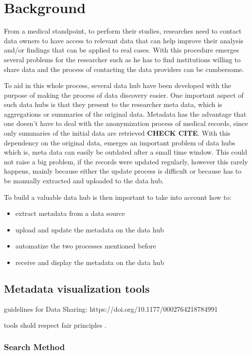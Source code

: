 \chapter{Background}
\label{chapter:background}

From a medical standpoint, to perform their studies, researches need to contact data
owners to have access to relevant data that can help improve their analysis and/or
findings that can be applied to real cases.
With this procedure emerges several problems for the researcher such as he has to find
institutions willing to share data and the process of contacting the data providers can
be cumbersome.

To aid in this whole process, several data hub have been developed with the purpose of
making the process of data discovery easier.
One important aspect of such data hubs is that they present to the researcher meta
data, which is aggregations or summaries of the original data.
Metadata has the advantage that one doesn't have to deal with the anonymization process
of medical records, since only summaries of the initial data are retrieved
\textbf{CHECK CITE}.
With this dependency on the original data, emerges an important problem of data hubs
which is, meta data can easily be outdated after a small time window.
This could not raise a big problem, if the records were updated regularly, however this
rarely happens, mainly because either the update process is difficult or because has to
be manually extracted and uploaded to the data hub.

To build a valuable data hub is then important to take into account how to:
\begin{itemize}
    \item extract metadata from a data source
    \item upload and update the metadata on the data hub
    \item automatize the two processes mentioned before
    \item receive and display the metadata on the data hub
\end{itemize}

\section{Metadata visualization tools}
guidelines for Data Sharing: https://doi.org/10.1177/0002764218784991

tools shold respect fair principles \cite{fair}.

\subsection{Search Method}

